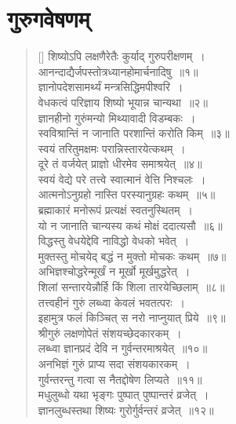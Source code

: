 \documentclass[twoside,12pt,notitlepage]{book}
\begin{document}
\section{गुरुगवेषणम्}
\begin{verse}[\versewidth]
शिष्योऽपि लक्षणैरेतैः कुर्याद् गुरुपरीक्षणम्~।\\[-6pt]
आनन्दाद्यैर्जपस्तोत्रध्यानहोमार्चनादिषु~॥१॥\\
ज्ञानोपदेशसामर्थ्यं मन्त्रसिद्धिमपीश्वरि~।\\[-6pt]
वेधकत्वं परिज्ञाय शिष्यो भूयान्न चान्यथा~॥२॥\\
ज्ञानहीनो गुरुंमन्यो मिथ्यावादी विडम्बकः~।\\[-6pt]
स्वविश्रान्तिं न जानाति परशान्तिं करोति किम्~॥३॥\\
स्वयं तरितुमक्षमः परान्निस्तारयेत्कथम्~।\\[-6pt]
दूरे तं वर्जयेत् प्राज्ञो धीरमेव समाश्रयेत्~॥४॥\\
स्वयं वेद्ये परे तत्त्वे स्वात्मानं वेत्ति निश्चलः~।\\[-6pt]
आत्मनोऽनुग्रहो नास्ति परस्यानुग्रहः कथम्~॥५॥\\
ब्रह्माकारं मनोरूपं प्रत्यक्षं स्वतनुस्थितम्~।\\[-6pt]
यो न जानाति चान्यस्य कथं मोक्षं ददात्यसौ~॥६॥\\
विद्धस्तु वेधयेद्देवि नाविद्धो वेधको भवेत्~।\\[-6pt]
मुक्तस्तु मोचयेद् बद्धं न मुक्तो मोचकः कथम्~॥७॥\\
अभिज्ञश्चोद्धरेन्मूर्खं न मूर्खो मूर्खमुद्धरेत्~।\\[-6pt]
शिलां सन्तारयेन्नौर्हि किं शिला तारयेच्छिलाम्~॥८॥\\
तत्त्वहीनं गुरुं लब्ध्वा केवलं भवतत्परः~।\\[-6pt]
इहामुत्र फलं किञ्चित् स नरो नाप्नुयात् प्रिये~॥९॥\\
श्रीगुरुं लक्षणोपेतं संशयच्छेदकारकम्~।\\[-6pt]
लब्ध्वा ज्ञानप्रदं देवि न गुर्वन्तरमाश्रयेत्~॥१०॥\\
अनभिज्ञं गुरुं प्राप्य सदा संशयकारकम्~।\\[-6pt]
गुर्वन्तरन्तु गत्वा स नैतद्दोषेण लिप्यते~॥११॥\\
मधुलुब्धो यथा भृङ्गः पुष्पात् पुष्पान्तरं व्रजेत्~।\\[-6pt]
ज्ञानलुब्धस्तथा शिष्यः गुरोर्गुर्वन्तरं व्रजेत्~॥१२॥
\end{verse}
\end{document}
